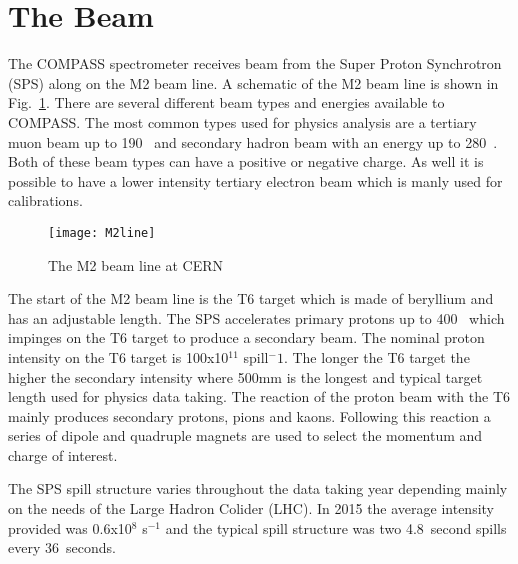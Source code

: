 \section{The Beam}
The COMPASS spectrometer receives beam from the Super Proton Synchrotron (SPS)
along on the M2 beam line.  A schematic of the M2 beam line is shown in
Fig.~\ref{fig::M2line}.  There are several different beam types and energies
available to COMPASS.  The most common types used for physics analysis are a
tertiary muon beam up to 190~{\gvc} and secondary hadron beam with an energy up
to 280~{\gvc}.  Both of these beam types can have a positive or negative charge.
As well it is possible to have a lower intensity tertiary electron beam which is
manly used for calibrations. \par

\begin{figure}[h!t]
  \centering
  \texttt{[image: M2line]}
  \caption{The M2 beam line at CERN}
  \label{fig::M2line}
\end{figure}

The start of the M2 beam line is the T6 target which is made of beryllium and
has an adjustable length.  The SPS accelerates primary protons up to 400~{\gvc}
which impinges on the T6 target to produce a secondary beam.  The nominal proton
intensity on the T6 target is 100x10$^{11}$ spill$^-1$.  The longer the T6
target the higher the secondary intensity where 500mm is the longest and typical
target length used for physics data taking.  The reaction of the proton beam
with the T6 mainly produces secondary protons, pions and kaons.  Following this
reaction a series of dipole and quadruple magnets are used to select the
momentum and charge of interest. \par

The SPS spill structure varies throughout the data taking year depending mainly
on the needs of the Large Hadron Colider (LHC).  In 2015 the average intensity
provided was 0.6x10$^8$ s$^{-1}$ and the typical spill structure was two
4.8~second spills every 36~seconds.

